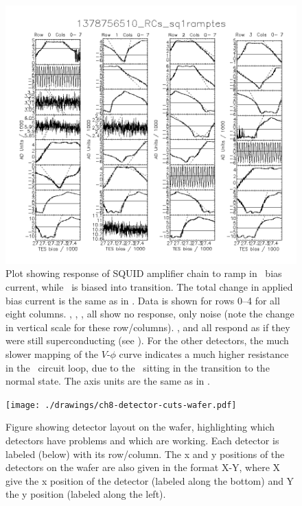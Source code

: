 \begin{figure}
\centering
\includegraphics[width=\textwidth]{./images/1378756510_RCs_sq1ramptes_00.png}
\caption[\SQUID\ response to \TES\ bias ramp (transition)]{Plot showing response of SQUID amplifier chain to ramp in \TES\ bias current, while \TES\ is biased into transition.
  The total change in applied bias current is the same as in .
  Data is shown for rows 0--4 for all eight columns.
  , , ,  all show no response, only noise (note the change in vertical scale for these row/columns).
  ,  and  all respond as if they were still superconducting (see ).
  For the other detectors, the much slower mapping of the $V$-$\phi$ curve indicates a much higher resistance in the \TES\ circuit loop, due to the \TES\ sitting in the transition to the normal state.
  The axis units are the same as in .
}
\label{fig:tes-bias-ramp-trans}
\end{figure}

\begin{figure}
\centering
\texttt{[image: ./drawings/ch8-detector-cuts-wafer.pdf]}
\caption[Detector layout on wafer]{
Figure showing detector layout on the wafer, highlighting which detectors have problems and which are working.
Each detector is labeled (below) with its row/column.
The x and y positions of the detectors on the wafer are also given in the format X-Y, where X give the x position of the detector (labeled along the bottom) and Y the y position (labeled along the left).
}
\label{fig:detector-cuts-wafer}
\end{figure}

